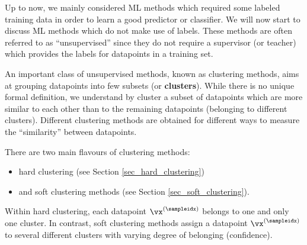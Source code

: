 \documentclass[12pt]{report}
\begin{document}
Up to now, we mainly considered ML methods which required 
some labeled training data in order to learn a good predictor or 
classifier. We will now start to discuss ML methods which do 
not make use of labels. These methods are often referred to as 
``unsupervised'' since they do not require a supervisor 
(or teacher) which provides the labels for datapoints in a training set. 

An important class of unsupervised methods, known as clustering 
methods, aims at grouping datapoints into few subsets (or {\bf clusters}). 
While there is no unique formal definition, we understand by cluster 
a subset of datapoints which are more similar to each other than 
to the remaining datapoints (belonging to different clusters). Different 
clustering methods are obtained for different ways to measure the 
``similarity'' between datapoints. 

%
%

There are two main flavours of clustering methods: 
\begin{itemize} 
\item hard clustering (see Section \ref{sec_hard_clustering}) 
\item and soft clustering methods (see Section \ref{sec_soft_clustering}).
\end{itemize}
Within hard clustering, each datapoint $\vx^{(\sampleidx)}$ belongs to one and only one cluster. In contrast, 
soft clustering methods assign a datapoint $\vx^{(\sampleidx)}$ to several different clusters with varying degree 
of belonging (confidence). 
\end{document}
